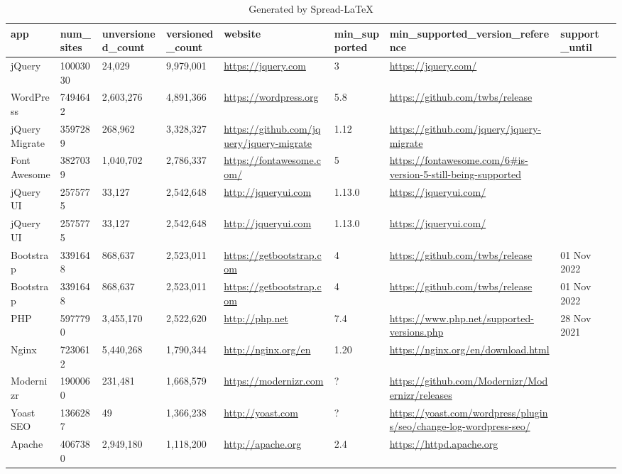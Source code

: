 		\begin{table}[!htp]\centering	
			\caption{Generated by Spread-LaTeX}\label{tab: }
			\scriptsize
			\begin{tabular}{|l|l|l|l|l|l|l|l|l|}\toprule
				app &num\_sites &unversioned\_count &versioned\_count &website &min\_supported &min\_supported\_version\_reference &support\_until \\\midrule 
				jQuery &10003030 &24,029 &9,979,001 &\ul{https://jquery.com} &3 &\ul{https://jquery.com/} & \\
				WordPress &7494642 &2,603,276 &4,891,366 &\ul{https://wordpress.org} &5.8 &\ul{https://github.com/twbs/release} & \\
				jQuery Migrate &3597289 &268,962 &3,328,327 &\ul{https://github.com/jquery/jquery-migrate} &1.12 &\ul{https://github.com/jquery/jquery-migrate} & \\
				Font Awesome &3827039 &1,040,702 &2,786,337 &\ul{https://fontawesome.com/} &5 &\url{https://fontawesome.com/6\#is-version-5-still-being-supported} & \\
				jQuery UI &2575775 &33,127 &2,542,648 &\ul{http://jqueryui.com} &1.13.0 &\ul{https://jqueryui.com/} & \\
				jQuery UI &2575775 &33,127 &2,542,648 &\ul{http://jqueryui.com} &1.13.0 &\ul{https://jqueryui.com/} & \\
				Bootstrap &3391648 &868,637 &2,523,011 &\ul{https://getbootstrap.com} &4 &\ul{https://github.com/twbs/release} &01 Nov 2022 \\
				Bootstrap &3391648 &868,637 &2,523,011 &\ul{https://getbootstrap.com} &4 &\ul{https://github.com/twbs/release} &01 Nov 2022 \\
				PHP &5977790 &3,455,170 &2,522,620 &\ul{http://php.net} &7.4 &\ul{https://www.php.net/supported-versions.php} &28 Nov 2021 \\
				Nginx &7230612 &5,440,268 &1,790,344 &\ul{http://nginx.org/en} &1.20 &\ul{https://nginx.org/en/download.html} & \\
				Modernizr &1900060 &231,481 &1,668,579 &\ul{https://modernizr.com} &? &\ul{https://github.com/Modernizr/Modernizr/releases} & \\
				Yoast SEO &1366287 &49 &1,366,238 &\ul{http://yoast.com} &? &\ul{https://yoast.com/wordpress/plugins/seo/change-log-wordpress-seo/} & \\
				Apache &4067380 &2,949,180 &1,118,200 &\ul{http://apache.org} &2.4 &\ul{https://httpd.apache.org} & \\

\end{tabular}
\end{table}
